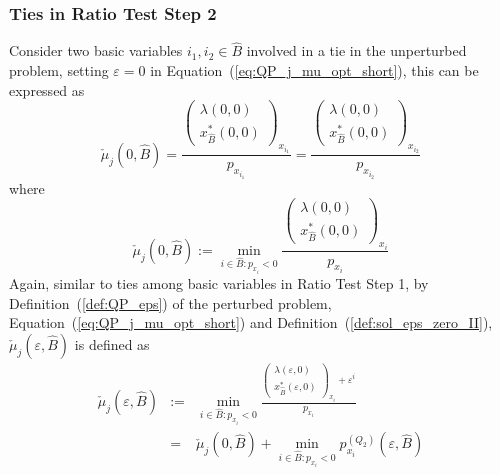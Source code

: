 \documentclass[a4paper]{article}
\begin{document}
\subsubsection{Ties in Ratio Test Step 2}
\label{sec:Ties_ratio_test_step_2}
Consider two basic variables $i_{1}, i_{2} \in \hat{B}$ involved in a tie in
the unperturbed problem, setting $\varepsilon=0$ in
Equation~(\ref{eq:QP_j_mu_opt_short}), this can be expressed as 
\begin{equation}
\check{\mu}_{j}(0, \hat{B}) =
\frac{\left(\begin{array}{c}
              \lambda\left(0,0\right) \\
              \hline
               x_{\hat{B}}^{*}\left(0,0\right)
            \end{array}
      \right)_{x_{i_{1}}}}{p_{x_{i_{1}}}}
=
\frac{\left(\begin{array}{c}
              \lambda\left(0,0\right) \\
              \hline
              x_{\hat{B}}^{*}\left(0,0\right) 
            \end{array}
       \right)_{x_{i_{2}}}}{p_{x_{i_{2}}}}
\end{equation}
where
\begin{equation}
\label{def:hat_mu_j_min_0}
  \check{\mu}_{j}(0, \hat{B}) :=
  \min_{i \in \hat{B}: p_{x_{i}} < 0}
  \frac{\left(\begin{array}{c}
                \lambda\left(0,0\right) \\
	        \hline
	        x_{\hat{B}}^{*}\left(0,0\right)
	       \end{array}
         \right)_{x_{i}}}{p_{x_{i}}} 
\end{equation}
Again, similar to ties among basic variables in Ratio Test Step 1,
by Definition~(\ref{def:QP_eps}) of the perturbed problem,
Equation~(\ref{eq:QP_j_mu_opt_short}) and
Definition~(\ref{def:sol_eps_zero_II}),
$\check{\mu}_{j}(\varepsilon, \hat{B})$ is defined as
\begin{eqnarray}
\label{def:hat_mu_j_min_eps}
\check{\mu}_{j}(\varepsilon, \hat{B}) & := &
  \min_{i \in \hat{B}: p_{x_{i}} < 0}
  \frac{\left(\begin{array}{c}
                \lambda\left(\varepsilon, 0\right) \\
	        \hline
	        x_{\hat{B}}^{*}\left(\varepsilon,0\right)
	      \end{array}
        \right)_{x_{i}}+ \varepsilon^{i}}{p_{x_{i}}} \\
  &=&
  \check{\mu}_{j}(0, \hat{B}) +
  \min_{i \in \hat{B}: p_{x_{i}} < 0} p_{x_{i}}^{(Q_{2})}
  (\varepsilon, \hat{B})
\end{eqnarray}
\end{document}
